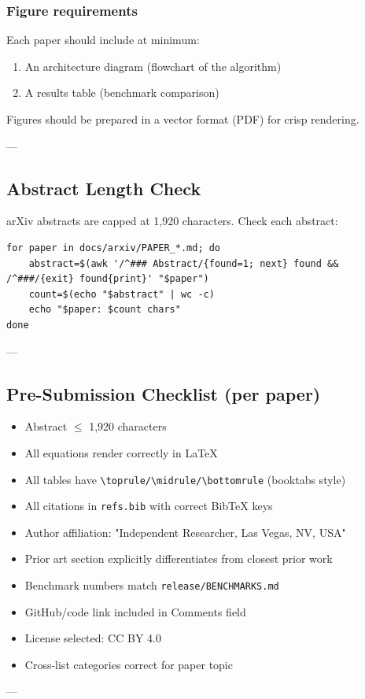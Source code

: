 \documentclass[10pt,journal,compsoc]{IEEEtran}
\begin{document}
\subsubsection{Figure requi\-rements}
Each paper should include at minimum:
\begin{enumerate}
\item An archi\-tecture diagram (flowchart of the algorithm)
\item A results table (benchmark comparison)

\end{enumerate}
Figures should be prepared in a vector format (PDF) for crisp rendering.

---

\subsection{Abstract Length Check}

arXiv abstracts are capped at 1,920 characters. Check each abstract:

\begin{lstlisting}
for paper in docs/arxiv/PAPER_*.md; do
    abstract=$(awk '/^### Abstract/{found=1; next} found && /^###/{exit} found{print}' "$paper")
    count=$(echo "$abstract" | wc -c)
    echo "$paper: $count chars"
done
\end{lstlisting}

---

\subsection{Pre-Submission Checklist (per paper)}

\begin{itemize}
\item [ ] Abstract $\le$ 1,920 characters
\item [ ] All equations render correctly in LaTeX
\item [ ] All tables have \texttt{\textbackslash toprule/\textbackslash midrule/\textbackslash bottomrule} (booktabs style)
\item [ ] All citations in \texttt{refs.bib} with correct BibTeX keys
\item [ ] Author affiliation: "Independent Researcher, Las Vegas, NV, USA"
\item [ ] Prior art section explicitly diffe\-rentiates from closest prior work
\item [ ] Benchmark numbers match \texttt{release/BENCHMARKS.md}
\item [ ] GitHub/code link included in Comments field
\item [ ] License selected: CC BY 4.0
\item [ ] Cross-list categories correct for paper topic

\end{itemize}
---
\end{document}
